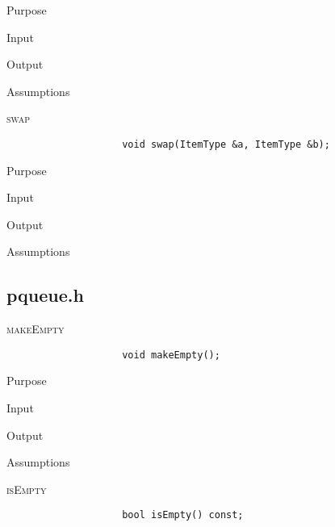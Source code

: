 \documentclass[pdftex, 12pt]{article}
\begin{document}
\begin{description}
\begin{description}
\begin{description}
\begin{description}
					\item{Purpose}

					\item{Input}

					\item{Output}

					\item{Assumptions}

				\end{description}
			\item{\textsc{swap}}
				\begin{lstlisting}
					void swap(ItemType &a, ItemType &b);
				\end{lstlisting}
				\begin{description}

					\item{Purpose}

					\item{Input}

					\item{Output}

					\item{Assumptions}

				\end{description}
		\end{description}
		\subsection{pqueue.h}
		\begin{description}

			\item{\textsc{makeEmpty}}
				\begin{lstlisting}
					void makeEmpty();
				\end{lstlisting}
				\begin{description}

					\item{Purpose}

					\item{Input}

					\item{Output}

					\item{Assumptions}

				\end{description}
			\item{\textsc{isEmpty}}
				\begin{lstlisting}
					bool isEmpty() const;
				\end{lstlisting}
				\begin{description}


\end{description}
\end{description}
\end{description}
\end{description}
\end{document}
